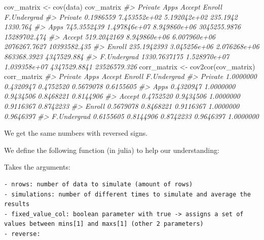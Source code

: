 \documentclass[
]{article}
\newenvironment{Shaded}{\begin{snugshade}}{\end{snugshade}}
\newcommand{\CommentTok}[1]{\textcolor[rgb]{0.56,0.35,0.01}{\textit{#1}}}
\newcommand{\FunctionTok}[1]{\textcolor[rgb]{0.00,0.00,0.00}{#1}}
\newcommand{\NormalTok}[1]{#1}
\newcommand{\OtherTok}[1]{\textcolor[rgb]{0.56,0.35,0.01}{#1}}
\begin{document}
\begin{Shaded}
\begin{Highlighting}[]
\NormalTok{cov\_matrix }\OtherTok{\textless{}{-}} \FunctionTok{cov}\NormalTok{(data)}
\NormalTok{cov\_matrix}
\CommentTok{\#\textgreater{}                  Private         Apps       Accept       Enroll  F.Undergrad}
\CommentTok{\#\textgreater{} Private        0.1986559 7.453552e+02 5.192042e+02     235.1942     1330.764}
\CommentTok{\#\textgreater{} Apps         745.3552439 1.497846e+07 8.949860e+06 3045255.9876 15289702.474}
\CommentTok{\#\textgreater{} Accept       519.2042169 8.949860e+06 6.007960e+06 2076267.7627 10393582.435}
\CommentTok{\#\textgreater{} Enroll       235.1942393 3.045256e+06 2.076268e+06  863368.3923  4347529.884}
\CommentTok{\#\textgreater{} F.Undergrad 1330.7637175 1.528970e+07 1.039358e+07 4347529.8841 23526579.326}
\NormalTok{corr\_matrix }\OtherTok{\textless{}{-}} \FunctionTok{cov2cor}\NormalTok{(cov\_matrix)}
\NormalTok{corr\_matrix}
\CommentTok{\#\textgreater{}               Private      Apps    Accept    Enroll F.Undergrad}
\CommentTok{\#\textgreater{} Private     1.0000000 0.4320947 0.4752520 0.5679078   0.6155605}
\CommentTok{\#\textgreater{} Apps        0.4320947 1.0000000 0.9434506 0.8468221   0.8144906}
\CommentTok{\#\textgreater{} Accept      0.4752520 0.9434506 1.0000000 0.9116367   0.8742233}
\CommentTok{\#\textgreater{} Enroll      0.5679078 0.8468221 0.9116367 1.0000000   0.9646397}
\CommentTok{\#\textgreater{} F.Undergrad 0.6155605 0.8144906 0.8742233 0.9646397   1.0000000}
\end{Highlighting}
\end{Shaded}

We get the same numbers with reversed signs.

\newpage

We define the following function (in julia) to help our understanding:

Takes the arguments:

\begin{verbatim}
- nrows: number of data to simulate (amount of rows)
- simulations: number of different times to simulate and average the results
- fixed_value_col: boolean parameter with true -> assigns a set of values between mins[1] and maxs[1] (other 2 parameters)
- reverse: 
\end{verbatim}
\end{document}
